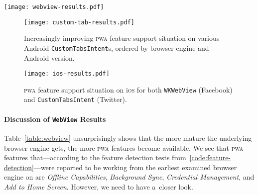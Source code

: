 \documentclass[sigconf,hyphens]{acmart}
\begin{document}
\begin{figure*}[t]
  \setcounter{figure}{0}
  \renewcommand{\figurename}{Table}
  \begin{center}
  \centerline{\texttt{[image: webview-results.pdf]}}
  \caption{Increasingly improving \textsc{pwa} feature support situation
    on various Android \texttt{WebView}s, ordered by browser engine and Android version.
    The sole \emph{seemingly} supported Web Share feature in Chrome~61
    was actually a bug (\url{https://crbug.com/765923}).}
  \label{table:webview}
  \end{center}
\end{figure*}

\begin{figure}[t]
  \renewcommand{\figurename}{Table}
  \begin{center}
  \centerline{\texttt{[image: custom-tab-results.pdf]}}
  \caption{Increasingly improving \textsc{pwa} feature support situation
    on various Android \texttt{CustomTabsIntent}s,
    ordered by browser engine and Android version.}
  \label{table:customtab}
  \end{center}
\end{figure}

\begin{figure}[t]
  \renewcommand{\figurename}{Table}
  \begin{center}
  \centerline{\texttt{[image: ios-results.pdf]}}
  \caption{\textsc{pwa} feature support situation on i\textsc{os} for both \texttt{WKWebView} (Facebook)
    and \texttt{CustomTabsIntent} (Twitter).}
  \label{table:safari}
  \end{center}
\end{figure}

\paragraph{\textbf{Discussion of \texttt{WebView} Results}}

Table~\ref{table:webview} unsurprisingly shows that the more mature
the underlying browser engine gets, the more \textsc{pwa} features become available.
We see that \textsc{pwa} features that---according to the feature detection tests
from~\autoref{code:feature-detection}---were reported to be working
from the earliest examined browser engine on are \emph{Offline Capabilities},
\emph{Background Sync}, \emph{Credential Management}, and \emph{Add to Home Screen}.
However, we need to have a~closer look.
\end{document}
